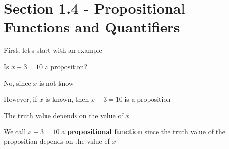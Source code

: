 \documentclass[../../Main.tex]{subfiles}
\begin{document}
\section{Section 1.4 - Propositional Functions and Quantifiers}

First, let's start with an example

\begin{example}
    Is $x + 3 = 10$ a proposition?
    
    \begin{solution}
        No, since $x$ is not know
    \end{solution}

    \medskip
    
    However, if $x$ is known, then $x + 3 = 10$ is a proposition

    The truth value depends on the value of $x$
\end{example}

\begin{definition}
    We call $x + 3 = 10$ a \textbf{propositional function} since the truth value of the proposition depends on the value of $x$
\end{definition}
\end{document}
